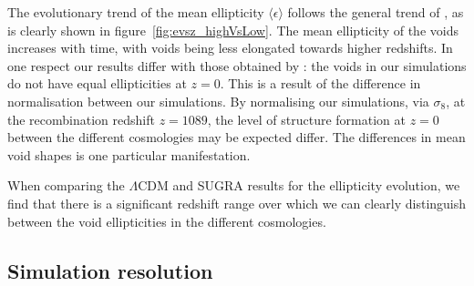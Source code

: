 The evolutionary trend of the mean ellipticity $\langle\epsilon\rangle$ follows the general trend of \citet{leepark09}, 
as is clearly shown in figure~\ref{fig:evsz_highVsLow}. The mean ellipticity of the voids increases with time, 
with voids being less elongated towards higher redshifts. In one respect our results differ with those obtained by 
\citep{leepark09,lavaux10}: the voids in our simulations do not have equal ellipticities at $z=0$. This is a result 
of the difference in normalisation between our simulations. By normalising our simulations, via $\sigma_8$, at 
the recombination redshift $z=1089$, the level of structure formation at $z=0$ between the different cosmologies  
may be expected differ. The differences in mean void shapes is one particular manifestation. 

When comparing the $\Lambda$CDM and SUGRA results for the ellipticity evolution, we find that there is 
a significant redshift range over which we can clearly distinguish between the void ellipticities in the 
different cosmologies. 

\subsection{Simulation resolution}
\label{sec:lowVShigh}

